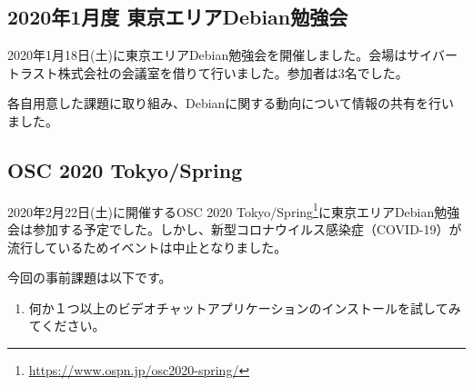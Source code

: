 \documentclass[mingoth,a4paper]{jsarticle}
\begin{document}

\subsection{2020年1月度 東京エリアDebian勉強会}

2020年1月18日(土)に東京エリアDebian勉強会を開催しました。会場はサイバートラスト株式会社の会議室を借りて行いました。参加者は3名でした。

各自用意した課題に取り組み、Debianに関する動向について情報の共有を行いました。


\subsection{OSC 2020 Tokyo/Spring}

2020年2月22日(土)に開催するOSC 2020 Tokyo/Spring\footnote{\url{https://www.ospn.jp/osc2020-spring/}}に東京エリアDebian勉強会は参加する予定でした。しかし、新型コロナウイルス感染症（COVID-19）が流行しているためイベントは中止となりました。



今回の事前課題は以下です。

\begin{enumerate}
\item 何か１つ以上のビデオチャットアプリケーションのインストールを試してみてください。
\end{enumerate}


\begin{multicols}{2}
{\small

}
\end{multicols}

%
%
%
%



\end{document}
